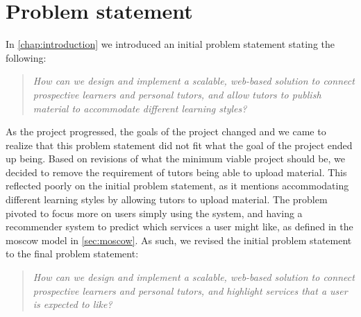 \section{Problem statement}
In \autoref{chap:introduction} we introduced an initial problem statement stating the following:
\begin{quote}
    \textit{How can we design and implement a scalable, web-based solution to connect prospective learners and personal tutors, and allow tutors to publish material to accommodate different learning styles?}
\end{quote}
As the project progressed, the goals of the project changed and we came to realize that this problem statement did not fit what the goal of the project ended up being.
Based on revisions of what the minimum viable project should be, we decided to remove the requirement of tutors being able to upload material.
This reflected poorly on the initial problem statement, as it mentions accommodating different learning styles by allowing tutors to upload material.
The problem pivoted to focus more on users simply using the system, and having a recommender system to predict which services a user might like, as defined in the moscow model in \autoref{sec:moscow}.
As such, we revised the initial problem statement to the final problem statement:
\begin{quote}
    \textit{How can we design and implement a scalable, web-based solution to connect prospective learners and personal tutors, and highlight services that a user is expected to like?}
\end{quote}
